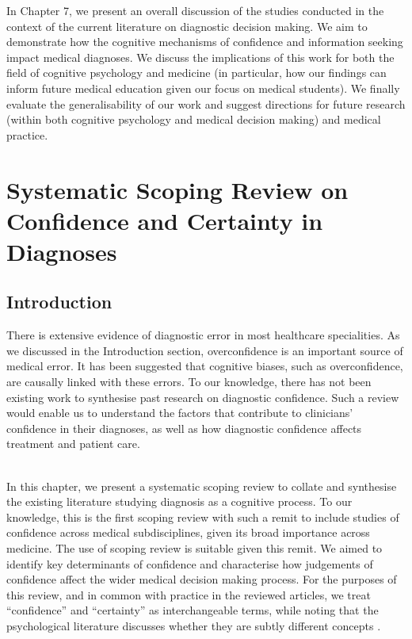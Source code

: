 \documentclass[a4paper, nobind]{templates/ociamthesis}
\begin{document}
\hfill\break
In Chapter 7, we present an overall discussion of the studies conducted in the context of the current literature on diagnostic decision making. We aim to demonstrate how the cognitive mechanisms of confidence and information seeking impact medical diagnoses. We discuss the implications of this work for both the field of cognitive psychology and medicine (in particular, how our findings can inform future medical education given our focus on medical students). We finally evaluate the generalisability of our work and suggest directions for future research (within both cognitive psychology and medical decision making) and medical practice.

\chapter{Systematic Scoping Review on Confidence and Certainty in Diagnoses}\label{chapter-2}

\adjustmtc
{}

\section{Introduction}\label{introduction}

There is extensive evidence of diagnostic error in most healthcare specialities. As we discussed in the Introduction section, overconfidence is an important source of medical error. It has been suggested that cognitive biases, such as overconfidence, are causally linked with these errors. To our knowledge, there has not been existing work to synthesise past research on diagnostic confidence. Such a review would enable us to understand the factors that contribute to clinicians' confidence in their diagnoses, as well as how diagnostic confidence affects treatment and patient care.\\
\strut \\
In this chapter, we present a systematic scoping review to collate and synthesise the existing literature studying diagnosis as a cognitive process. To our knowledge, this is the first scoping review with such a remit to include studies of confidence across medical subdisciplines, given its broad importance across medicine. The use of scoping review is suitable given this remit. We aimed to identify key determinants of confidence and characterise how judgements of confidence affect the wider medical decision making process. For the purposes of this review, and in common with practice in the reviewed articles, we treat ``confidence'' and ``certainty'' as interchangeable terms, while noting that the psychological literature discusses whether they are subtly different concepts \autocite{pouget_confidence_2016}.
\end{document}
